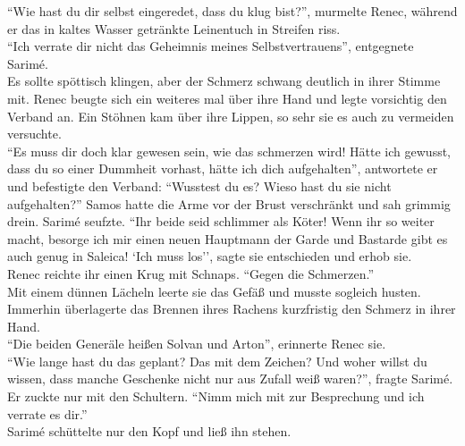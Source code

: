 ``Wie hast du dir selbst eingeredet, dass du klug bist?'', murmelte Renec, während er das in kaltes 
Wasser getränkte Leinentuch in Streifen riss.\\
``Ich verrate dir nicht das Geheimnis meines Selbstvertrauens'', entgegnete Sarimé.\\
Es sollte spöttisch klingen, aber der Schmerz schwang deutlich in ihrer Stimme mit. Renec beugte 
sich ein weiteres mal über ihre Hand und legte vorsichtig den Verband an. Ein Stöhnen kam über ihre 
Lippen, so sehr sie es auch zu vermeiden versuchte.\\
``Es muss dir doch klar gewesen sein, wie das schmerzen wird!  Hätte ich gewusst, dass du so 
einer Dummheit vorhast, hätte ich dich aufgehalten'', antwortete er und befestigte den Verband: 
``Wusstest du es? Wieso hast du sie nicht aufgehalten?''
Samos hatte die Arme vor der Brust verschränkt und sah grimmig drein. Sarimé seufzte. ``Ihr beide 
seid schlimmer als Köter! Wenn ihr so weiter macht, besorge ich mir einen neuen Hauptmann der Garde 
und Bastarde gibt es auch genug in Saleica! `Ich muss los'', sagte sie entschieden und erhob sie.\\
Renec reichte ihr einen Krug mit Schnaps. ``Gegen die Schmerzen.''\\
Mit einem dünnen Lächeln leerte sie das Gefäß und musste sogleich husten. Immerhin überlagerte das 
Brennen ihres Rachens kurzfristig den Schmerz in ihrer Hand.\\
``Die beiden Generäle heißen Solvan und Arton'', erinnerte Renec sie.\\
``Wie lange hast du das geplant? Das mit dem Zeichen? Und woher willst du wissen, dass manche 
Geschenke nicht nur aus Zufall weiß waren?'', fragte Sarimé.\\
Er zuckte nur mit den Schultern. ``Nimm mich mit zur Besprechung und ich verrate es dir.''\\
Sarimé schüttelte nur den Kopf und ließ ihn stehen.\\


